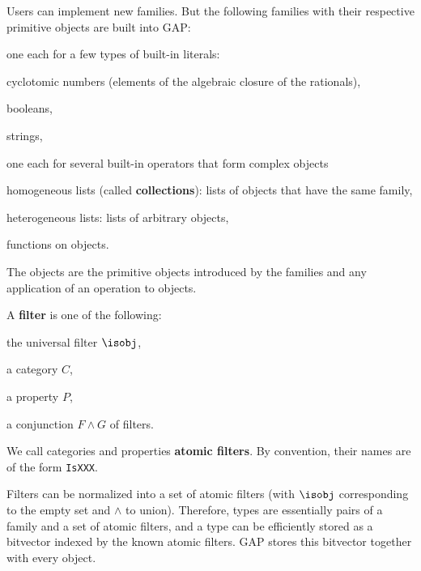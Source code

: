 Users can implement new families.
But the following families with their respective primitive objects are built into GAP:
\begin{compactitem}
  \item one each for a few types of built-in literals:
    \begin{compactitem}
      \item cyclotomic numbers (elements of the algebraic closure of the rationals),
      \item booleans,
      \item strings,
    \end{compactitem}
  \item one each for several built-in operators that form complex objects
    \begin{compactitem}
      \item homogeneous lists (called \textbf{collections}): lists of objects that have the same family,
      \item heterogeneous lists: lists of arbitrary objects,
      \item functions on objects.
    \end{compactitem}
\end{compactitem}

The objects are the primitive objects introduced by the families and any application of an operation to objects.

A \textbf{filter} is one of the following:
\begin{compactitem}
  \item the universal filter $\isobj$,
  \item a category $C$,
  \item a property $P$,
  \item a conjunction $F\wedge G$ of filters.
\end{compactitem}
We call categories and properties \textbf{atomic filters}.
By convention, their names are of the form \lstinline|IsXXX|.

Filters can be normalized into a set of atomic filters (with $\isobj$ corresponding to the empty set and $\wedge$ to union).
Therefore, types are essentially pairs of a family and a set of atomic filters, and a type can be efficiently stored as a bitvector indexed by the known atomic filters.
GAP stores this bitvector together with every object.


